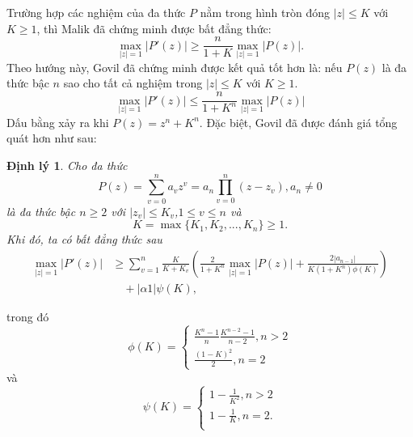 \documentclass[a5paper,12pt]{report}
\theoremstyle{definition}
\newtheorem{dinhly}{Định lý}[section]
\newcommand{\dl}{\begin{dinhly}\itshape}
\newcommand{\hdl}{\end{dinhly}}
\def\leq{\leqslant}
\def\geq{\geqslant}
\numberwithin{equation}{chapter}
\def\vt{\vert}
\def\vt{\vert}
\def\vt{\vert}
\begin{document}
	Trường hợp các nghiệm của đa thức $P$ nằm trong hình tròn đóng $\vt z\vt\leq K$ với $K\geq 1$, thì  Malik đã chứng minh được bất đẳng thức:
	\begin{equation}\label{(3)}
		\max\limits_{\vt z\vt=1}|P'(z)| \ge \frac{n}{1+K}\max\limits_{\vt z\vt=1}|P(z)|.
	\end{equation}
	Theo hướng này, Govil đã chứng minh được kết quả tốt hơn là:  nếu $P(z)$ là đa thức bậc $n$ sao cho tất cả nghiệm trong $|z|\leq K$ với $K\geq 1$.
	\begin{equation}\label{(5)}
		\max\limits_{\vt z\vt=1}|P'(z)| \le \frac{n}{1+K^n}\max\limits_{\vt z\vt=1}|P(z)|
	\end{equation}
	Dấu bằng xảy ra khi $P(z)=z^n+K^n$. Đặc biệt, Govil đã được đánh giá tổng quát hơn như sau:
	\dl  Cho đa thức $$P(z)=\sum_{v=0}^{n}a_vz^v=a_n\prod_{v=0}^{n}(z-z_v),a_n \ne 0$$ là đa thức bậc $n \ge 2$ với $|z_v|\le K_v$,$1 \le v \le n$ và $$K=\max\{K_1,K_2,...,K_n\} \ge 1.$$
	Khi đó, ta có bất đẳng thức sau
	\begin{equation} \label{(12)}
		\begin{split}
			\max\limits_{\vt z\vt=1}|P'(z)|  &\ge \sum_{v=1}^{n}\frac{K}{K+K_v}\left(\frac{2}{1+K^n}\max\limits_{\vt z\vt=1}|P(z)| +\frac{2|a_{n-1}|}{K(1+K^n)\phi(K)}\right) \\
			&\quad +  |\alpha 1|\psi(K),
		\end{split}
	\end{equation}
	
	trong đó
	\begin{equation}\label{hamphiK}
		\phi (K)=\begin{cases}
			\frac{K^n-1}{n}\frac{K^{n-2}-1}{n-2}, n>2\\
			\frac{(1-K)^2}{2}, n=2
		\end{cases}
	\end{equation}
	và
	\begin{equation}\label{hampsiK}
		\psi(K)=\begin{cases}
			1-\frac{1}{K^2}, n>2\\
			1-\frac{1}{K}, n=2.\\
		\end{cases}
	\end{equation}\hdl
\end{document}
